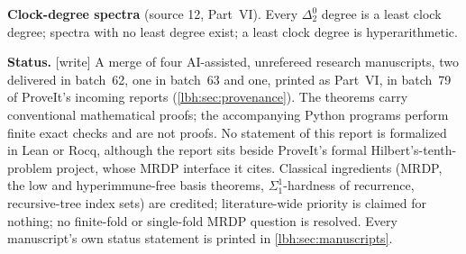 \documentclass[11pt,letterpaper]{article}
\theoremstyle{definition}
\theoremstyle{remark}
\newcommand{\an}{\Sigma^{1}_{1}}
\newcommand{\1}{\mathbf 1}
\newcommand{\wtag}{\textup{[write]}}%
\begin{document}
\begin{titlepage}
\begin{resultbox}
\textbf{Clock-degree spectra} (source 12, Part~VI). Every $\Delta^0_2$ degree is a least clock
degree; spectra with no least degree exist; a least clock degree is hyperarithmetic.
\end{resultbox}
\vfill
\small
\textbf{Status.} \wtag{} A merge of four AI-assisted, unrefereed research manuscripts, two
delivered in batch~62, one in batch~63 and one, printed as Part~VI, in batch~79 of ProveIt's
incoming reports (\cref{lbh:sec:provenance}).
The theorems carry conventional mathematical proofs; the accompanying Python programs perform
finite exact checks and are not proofs. No statement of this report is formalized in Lean or Rocq,
although the report sits beside ProveIt's formal Hilbert's-tenth-problem project, whose MRDP
interface it cites. Classical ingredients (MRDP, the low and hyperimmune-free basis theorems,
$\an$-hardness of recurrence, recursive-tree index sets) are credited; literature-wide priority is
claimed for nothing; no finite-fold or single-fold MRDP question is resolved. Every manuscript's own
status statement is printed in \cref{lbh:sec:manuscripts}.
\end{titlepage}
\hypersetup{pageanchor=true}
\setcounter{page}{1}
\end{document}
